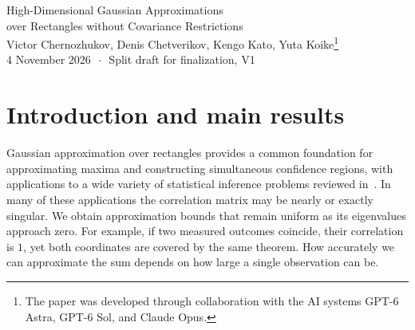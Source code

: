 \documentclass[11pt,letterpaper]{article}
\theoremstyle{remark}
\begin{document}
\begin{center}
{\Large High-Dimensional Gaussian Approximations\\[0.15em]
over Rectangles without Covariance Restrictions}\\[0.85em]
{\normalsize Victor Chernozhukov, Denis Chetverikov, Kengo Kato, Yuta
Koike\renewcommand{\thefootnote}{\fnsymbol{footnote}}\footnote{The paper
was developed through collaboration with the AI systems GPT-6 Astra,
GPT-6 Sol, and Claude Opus.}}\\[0.65em]
{\normalsize 4 November 2026 \(\,\cdot\,\) Split draft for finalization, V1}
\end{center}
\setcounter{footnote}{0}
\thispagestyle{plain}

\begin{abstract}

We study Gaussian approximation over rectangles for a sum of independent
centered random vectors. We require positive marginal variances and allow
arbitrary dependence among the coordinates, including exact linear dependence.
For \(n\) observations bounded coordinatewise by \(B\), with unit marginal
variances after normalization, the approximation error is at most
\[
 C\,\frac{B L^{3/2}}{\sqrt n}
 \sqrt{1+\log_+\!\left(\frac{\sqrt n}{B\sqrt L}\right)},
 \qquad L:=\log(ep),\quad \log_+x:=\max\{0,\log x\}.
\]
A bounded symmetric example attains the \(n^{-1/2}L^{3/2}\) scale for a fixed
envelope. Whether the remaining logarithm can be removed is open.
Clipping gives a corresponding result for sub-exponential coordinates.
For polynomial moment envelopes the rate changes with the moment order.
At order \(4\), under a separate coordinate fourth-moment bound, symmetric
examples attain the \(n^{-1/4}L^{5/4}\) rate for a fixed envelope.
For growing envelopes, the upper and lower bounds also match in their
dependence on \(B\) in the dimension regimes specified below.
\end{abstract}

\begingroup
\setcounter{tocdepth}{1}
\small
\tableofcontents
\endgroup
\clearpage

\section{\texorpdfstring{Introduction and main results}{Introduction and main results}}\label{sec:results}
Gaussian approximation over rectangles provides a common foundation for
approximating maxima and constructing simultaneous confidence regions, with
applications to a wide variety of statistical inference problems reviewed in~\cite{CCKK2023}.
In many of these applications the correlation matrix may be nearly or
exactly singular. We obtain approximation bounds that remain uniform
as its eigenvalues approach zero. For example, if two measured outcomes
coincide, their correlation is \(1\), yet both coordinates are covered
by the same theorem. How accurately we can approximate the sum depends on how large a
single observation can be.
\end{document}
